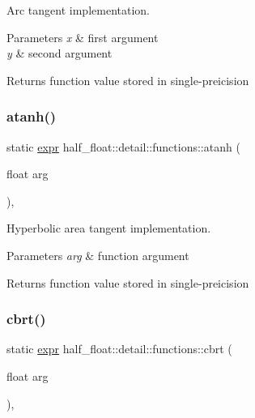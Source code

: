 Arc tangent implementation. 
\begin{DoxyParams}{Parameters}
{\em x} & first argument \\
\hline
{\em y} & second argument \\
\hline
\end{DoxyParams}
\begin{DoxyReturn}{Returns}
function value stored in single-\/preicision 
\end{DoxyReturn}
\mbox{\label{structhalf__float_1_1detail_1_1functions_a86b85df92954c684bfe4e1b462f67dea}} 
\subsubsection{\texorpdfstring{atanh()}{atanh()}}
{\footnotesize\ttfamily static \hyperlink{structhalf__float_1_1detail_1_1expr}{expr} half\+\_\+float\+::detail\+::functions\+::atanh (\begin{DoxyParamCaption}\item[{float}]{arg }\end{DoxyParamCaption})\hspace{0.3cm}{\ttfamily [inline]}, {\ttfamily [static]}}

Hyperbolic area tangent implementation. 
\begin{DoxyParams}{Parameters}
{\em arg} & function argument \\
\hline
\end{DoxyParams}
\begin{DoxyReturn}{Returns}
function value stored in single-\/preicision 
\end{DoxyReturn}
\mbox{\label{structhalf__float_1_1detail_1_1functions_ab756ef470ed99e39b670e08dd1126331}} 
\subsubsection{\texorpdfstring{cbrt()}{cbrt()}}
{\footnotesize\ttfamily static \hyperlink{structhalf__float_1_1detail_1_1expr}{expr} half\+\_\+float\+::detail\+::functions\+::cbrt (\begin{DoxyParamCaption}\item[{float}]{arg }\end{DoxyParamCaption})\hspace{0.3cm}{\ttfamily [inline]}, {\ttfamily [static]}}

